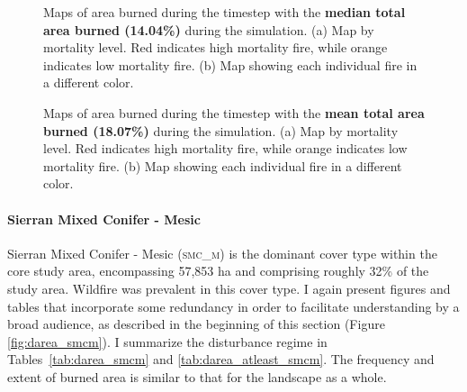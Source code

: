 \begin{figure}[!htbp]
  \centering
  \caption{Maps of area burned during the timestep with the \textbf{median total area burned (14.04\%)} during the simulation. (a) Map by mortality level. Red indicates high mortality fire, while orange indicates low mortality fire. (b) Map showing each individual fire in a different color.}
  \label{fig:darea_median_map}
\end{figure}

\begin{figure}[!htbp]
  \centering
  \caption{Maps of area burned during the timestep with the \textbf{mean total area burned (18.07\%)} during the simulation. (a) Map by mortality level. Red indicates high mortality fire, while orange indicates low mortality fire. (b) Map showing each individual fire in a different color.}
  \label{fig:darea_mean_map}
\end{figure}

\clearpage


\paragraph{Sierran Mixed Conifer - Mesic}
Sierran Mixed Conifer - Mesic (\textsc{smc\_m}) is the dominant cover type within the core study area, encompassing 57,853 ha and comprising roughly 32\% of the study area. Wildfire was prevalent in this cover type. I again present figures and tables that incorporate some redundancy in order to facilitate understanding by a broad audience, as described in the beginning of this section (Figure \ref{fig:darea_smcm}). I summarize the disturbance regime in Tables~\ref{tab:darea_smcm} and \ref{tab:darea_atleast_smcm}. The frequency and extent of burned area is similar to that for the landscape as a whole.


